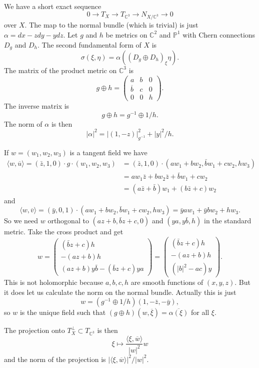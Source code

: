 \documentclass[11pt]{article}
\theoremstyle{definition}
\newcommand{\kk}[1]{\mathbb{#1}}
\def\ov#1{\overline{#1}}
\def\<{\langle}
\def\>{\rangle}
\begin{document}
We have a short exact sequence
$$
0 \to T_X \to T_{\kk C^3} \to N_{X/\kk C^3} \to 0
$$
over $X$.
The map to the normal bundle (which is trivial) is just $\alpha = dx - zdy - ydz$.
Let $g$ and $h$ be metrics on $\kk C^2$ and $\kk P^1$ with Chern connections
$D_g$ and $D_h$.
The second fundamental form of $X$ is
$$
\sigma(\xi, \eta)
= \alpha((D_g \oplus D_h)_\xi \eta).
$$
The matrix of the product metric on $\kk C^3$ is
$$
g \oplus h
= \begin{pmatrix}
a & b & 0
\\
\ov b & c & 0
\\
0 & 0 & h
\end{pmatrix}.
$$
The inverse matrix is
$$
g \oplus h
= g^{-1} \oplus 1/h.
$$
The norm of $\alpha$ is then
$$
|\alpha|^2
= |(1,-z)|^2_{g^{-1}} + |y|^2/h.
$$

If $w = (w_1, w_2, w_3)$ is a tangent field we have
\begin{align*}
\<w, \ov u \>
= (\bar z, 1, 0) \cdot g \cdot (w_1, w_2, w_3)
&= (\bar z, 1, 0) \cdot (a w_1 + b w_2, \bar b w_1 + c w_2, h w_3)
\\
&= a w_1 \bar z + b w_2 \bar z + \bar b w_1 + c w_2
\\
&= (a \bar z + \bar b) w_1 + (b \bar z + c) w_2
\end{align*}
and
$$
\< w, \ov v \>
= (\bar y, 0, 1) \cdot (a w_1 + b w_2, \bar b w_1 + c w_2, h w_3)
= \bar y a w_1 + \bar y b w_2 + h w_3.
$$
So we need $w$ orthogonal to $(a z + b, \bar b z + c, 0)$ and $(y a, y
\bar b, h)$ in the standard metric. Take the cross product and get
$$
w
= \begin{pmatrix}
(\bar b z + c)h
\\
- (a z + b) h
\\
(a z + b)y\bar b - (\bar b z + c)ya
\end{pmatrix}
= \begin{pmatrix}
(\bar b z + c)h
\\
- (a z + b) h
\\
(|b|^2 - ac)y
\end{pmatrix}.
$$
This is not holomorphic because $a,b,c,h$ are smooth functions of $(x,y,z)$.
But it does let us calculate the norm on the normal bundle.
Actually this is just
$$
w = (g^{-1} \oplus 1/h)(1, -\bar z, -\bar y),
$$
so $w$ is the unique field such that $(g \oplus h)(w, \ov \xi) = \ov{\alpha(\xi)}$ for all $\xi$.

The projection onto $T_X^\perp \subset T_{\kk C^3}$ is then
$$
\xi \mapsto \frac{\< \xi, \ov w \>}{|w|^2} w
$$
and the norm of the projection is $|\<\xi, \ov w \>|^2/|w|^2$.
\end{document}
